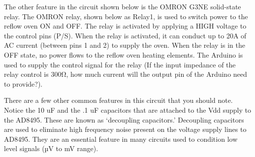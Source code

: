 \documentclass[10pt]{report}
\begin{document}
\par
	The other feature in the circuit shown below is the OMRON G3NE solid-state relay. The OMRON relay, shown below as Relay1, is used to switch power to the reflow oven ON and OFF. The relay is activated by applying a HIGH voltage to the control pins (P/S). When the relay is activated, it can conduct up to 20A of AC current (between pins 1 and 2) to supply the oven. When the relay is in the OFF state, no power flows to the reflow oven heating elements. The Arduino is used to supply the control signal for the relay (If the input impedance of the relay control is 300Ω, how much current will the output pin of the Arduino need to provide?). 
\par
	There are a few other common features in this circuit that you should note. Notice the 10 uF and the .1 uF capacitors that are attached to the Vdd supply to the AD8495. These are known as ‘decoupling capacitors.’ Decoupling capacitors are used to eliminate high frequency noise present on the voltage supply lines to AD8495. They are an essential feature in many circuits used to condition low level signals (µV to mV range).
\end{document}
